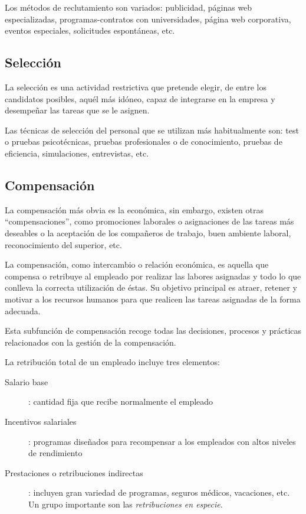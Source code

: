 \documentclass[10pt,a4paper,spanish]{report}
\begin{document}
                  Los métodos de reclutamiento son variados: publicidad, páginas web especializadas, programas-contratos con universidades, página web corporativa, eventos especiales, solicitudes espontáneas, etc.

            \subsection{\textcolor[rgb]{0.8,0.2,0.8}Selección}

                  La selección es una actividad restrictiva que pretende elegir, de entre los candidatos posibles, aquél más idóneo, capaz de integrarse en la empresa y desempeñar las tareas que se le asignen.

                  Las técnicas de selección del personal que se utilizan más habitualmente son: test o pruebas psicotécnicas, pruebas profesionales o de conocimiento, pruebas de eficiencia, simulaciones, entrevistas, etc.

            \subsection{\textcolor[rgb]{0.8,0.2,0.8}Compensación}

                  La compensación más obvia es la económica, sin embargo, existen otras ``compensaciones'', como promociones laborales o asignaciones de las tareas más deseables o la aceptación de los compañeros de trabajo, buen ambiente laboral, reconocimiento del superior, etc.

                  La compensación, como intercambio o relación económica, es aquella que compensa o retribuye al empleado por realizar las labores asignadas y todo lo que conlleva la correcta utilización de éstas. Su objetivo principal es atraer, retener y motivar a los recursos humanos para que realicen las tareas asignadas de la forma adecuada.

                  Esta subfunción de compensación recoge todas las decisiones, procesos y prácticas relacionados con la gestión de la compensación.

                  La retribución total de un empleado incluye tres elementos:
                  \begin{description}
                        \item[Salario base]: cantidad fija que recibe normalmente el empleado
                        \item[Incentivos salariales]: programas diseñados para recompensar a los empleados con altos niveles de rendimiento
                        \item[Prestaciones o retribuciones indirectas]: incluyen gran variedad de programas, seguros médicos, vacaciones, etc. Un grupo importante son las \textit{\textcolor[rgb]{0.8,0.2,0.8}{retribuciones en especie}}.
                  \end{description}
\end{document}
